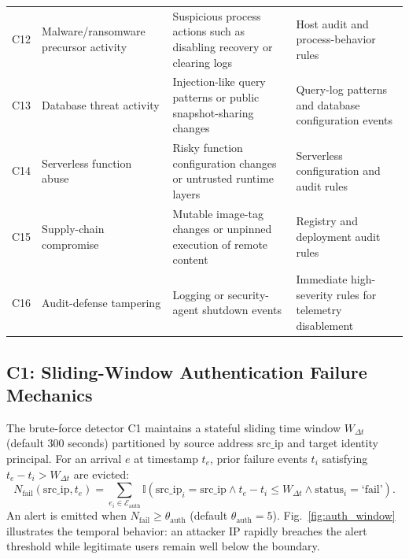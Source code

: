 \documentclass[conference]{IEEEtran}
\begin{document}
\begin{table}[t]
\begin{tabular}{p{0.55cm}p{2.65cm}p{5.0cm}p{5.0cm}}
C12 & Malware/ransomware precursor activity & Suspicious process actions such as disabling recovery or clearing logs & Host audit and process-behavior rules\\
C13 & Database threat activity & Injection-like query patterns or public snapshot-sharing changes & Query-log patterns and database configuration events\\
C14 & Serverless function abuse & Risky function configuration changes or untrusted runtime layers & Serverless configuration and audit rules\\
C15 & Supply-chain compromise & Mutable image-tag changes or unpinned execution of remote content & Registry and deployment audit rules\\
C16 & Audit-defense tampering & Logging or security-agent shutdown events & Immediate high-severity rules for telemetry disablement\\
\bottomrule
\end{tabular}
\end{table}

\subsection{C1: Sliding-Window Authentication Failure Mechanics}
The brute-force detector C1 maintains a stateful sliding time window $W_{\Delta t}$ (default 300 seconds) partitioned by source address $\mathrm{src\_ip}$ and target identity $\mathrm{principal}$. For an arrival $e$ at timestamp $t_e$, prior failure events $t_i$ satisfying $t_e - t_i > W_{\Delta t}$ are evicted:
\begin{equation}
N_{\mathrm{fail}}(\mathrm{src\_ip}, t_e) = \sum_{e_i \in \mathcal{E}_{\mathrm{auth}}} \mathbb{I}(\mathrm{src\_ip}_i = \mathrm{src\_ip} \land t_e - t_i \le W_{\Delta t} \land \mathrm{status}_i = \text{`fail'}).
\end{equation}
An alert is emitted when $N_{\mathrm{fail}} \ge \theta_{\mathrm{auth}}$ (default $\theta_{\mathrm{auth}} = 5$). Fig.~\ref{fig:auth_window} illustrates the temporal behavior: an attacker IP rapidly breaches the alert threshold while legitimate users remain well below the boundary.
\end{document}
